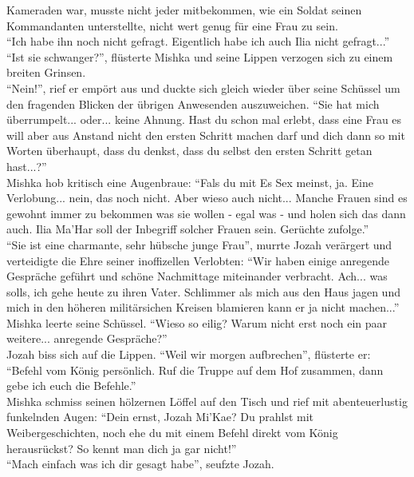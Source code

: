 Kameraden war, musste nicht jeder mitbekommen, wie ein Soldat seinen Kommandanten unterstellte, 
nicht wert genug für eine Frau zu sein.\\
``Ich habe ihn noch nicht gefragt. Eigentlich habe ich auch Ilia nicht gefragt...''\\
``Ist sie schwanger?'', flüsterte Mishka und seine Lippen verzogen sich zu einem breiten Grinsen.\\
``Nein!'', rief er empört aus und duckte sich gleich wieder über seine Schüssel um den fragenden 
Blicken der übrigen Anwesenden auszuweichen. ``Sie hat mich überrumpelt... oder... keine Ahnung. 
Hast du schon mal erlebt, dass eine Frau es will aber aus Anstand nicht den ersten Schritt machen 
darf und dich dann so mit Worten überhaupt, dass du denkst, dass du selbst den ersten Schritt getan 
hast...?''\\
Mishka hob kritisch eine Augenbraue: ``Fals du mit Es Sex meinst, ja. Eine Verlobung... nein, das 
noch nicht. Aber wieso auch nicht... Manche Frauen sind es gewohnt immer zu bekommen was sie wollen 
- egal was - und holen sich das dann auch. Ilia Ma'Har soll der Inbegriff solcher Frauen sein. 
Gerüchte zufolge.''\\
``Sie ist eine charmante, sehr hübsche junge Frau'', murrte Jozah verärgert und verteidigte die 
Ehre seiner inoffizellen Verlobten: ``Wir haben einige anregende Gespräche geführt und schöne 
Nachmittage miteinander verbracht. Ach... was solls, ich gehe heute zu ihren Vater. Schlimmer als 
mich aus den Haus jagen und mich in den höheren militärsichen Kreisen blamieren kann er ja nicht 
machen...''\\
Mishka leerte seine Schüssel. ``Wieso so eilig? Warum nicht erst noch ein paar weitere... anregende 
Gespräche?''\\
Jozah biss sich auf die Lippen. ``Weil wir morgen aufbrechen'', flüsterte er: ``Befehl vom König 
persönlich. Ruf die Truppe auf dem Hof zusammen, dann gebe ich euch die Befehle.''\\
Mishka schmiss seinen hölzernen Löffel auf den Tisch und rief mit abenteuerlustig funkelnden Augen: 
``Dein ernst, Jozah Mi'Kae? Du prahlst mit Weibergeschichten, noch ehe du mit einem Befehl direkt 
vom König herausrückst? So kennt man dich ja gar nicht!''\\
``Mach einfach was ich dir gesagt habe'', seufzte Jozah.\\

